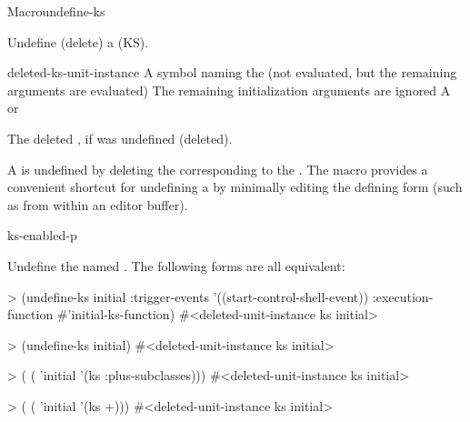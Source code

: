 \documentclass[10pt,twoside,english,pdftex]{article}
\begin{document}
\begin{functiondoc}{Macro}{undefine-ks}{
    }
%
%
%

\fnsyntax

\fnpurpose Undefine (delete) a  (KS).

\fnpackage {}

\fnmodule {}

\fnargs
\begin{args}{deleted-ks-unit-instance}
\arg[ks-name] A symbol naming the  (not evaluated, but the remaining
arguments are evaluated)
 The remaining initialization arguments are ignored
 A   or \nil{}
\end{args}

\fnreturns The deleted  , if
  was undefined (deleted).

\fndescription A  is undefined by deleting the 
corresponding to the .  The  macro
provides a convenient shortcut for undefining a  by minimally
editing the defining form (such as from within an editor buffer).

\begin{alsos}{ks-enabled-p}
\also[define-ks]
\also[ks-enabled-p]
\end{alsos}

\fnexamples
%
Undefine the  named . The following
forms are all equivalent:
%
\W\supp
\begin{example}
  > (undefine-ks initial
       :trigger-events '((start-control-shell-event)) 
       :execution-function #'initial-ks-function)
  #<deleted-unit-instance ks initial>\goodpagebreak

  > (undefine-ks initial)
  #<deleted-unit-instance ks initial>\goodpagebreak

  > ( 
       ( 'initial '(ks :plus-subclasses)))
  #<deleted-unit-instance ks initial>
  
  > ( 
       ( 'initial '(ks +)))
  #<deleted-unit-instance ks initial>

\end{example}

\end{functiondoc}
\end{document}
